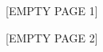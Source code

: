 \documentclass[addpoints]{exam}
\begin{document}
\begin{questions}
	\question
\fi %

	\newpage
	\begin{center}
		[EMPTY PAGE 1]
	\end{center}

	\newpage
	\begin{center}
		[EMPTY PAGE 2]
              \end{center}

\end{questions}
\end{document}
